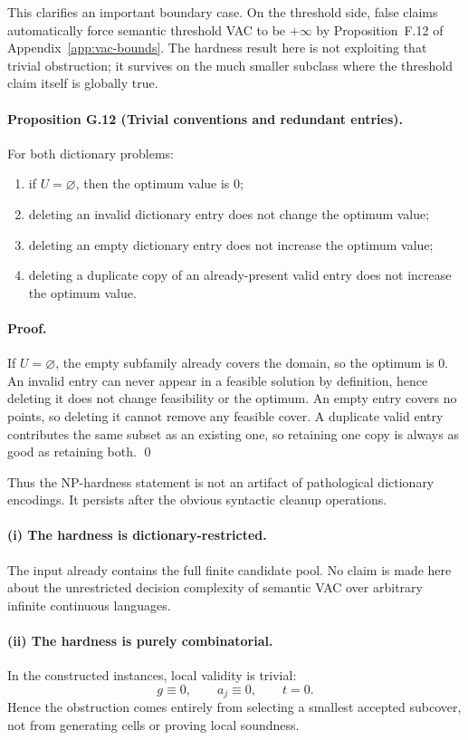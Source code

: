This clarifies an important boundary case. On the threshold side, false claims automatically force semantic threshold VAC to be $+\infty$ by Proposition~F.12 of Appendix~\ref{app:vac-bounds}. The hardness result here is not exploiting that trivial obstruction; it survives on the much smaller subclass where the threshold claim itself is globally true.

\paragraph{Proposition G.12 (Trivial conventions and redundant entries).}
For both dictionary problems:
\begin{enumerate}
    \item if $U=\varnothing$, then the optimum value is $0$;
    \item deleting an invalid dictionary entry does not change the optimum value;
    \item deleting an empty dictionary entry does not increase the optimum value;
    \item deleting a duplicate copy of an already-present valid entry does not increase the optimum value.
\end{enumerate}

\paragraph{Proof.}
If $U=\varnothing$, the empty subfamily already covers the domain, so the optimum is $0$. An invalid entry can never appear in a feasible solution by definition, hence deleting it does not change feasibility or the optimum. An empty entry covers no points, so deleting it cannot remove any feasible cover. A duplicate valid entry contributes the same subset as an existing one, so retaining one copy is always as good as retaining both. \qed

Thus the NP-hardness statement is not an artifact of pathological dictionary encodings. It persists after the obvious syntactic cleanup operations.

\paragraph{(i) The hardness is dictionary-restricted.}
The input already contains the full finite candidate pool. No claim is made here about the unrestricted decision complexity of semantic VAC over arbitrary infinite continuous languages.

\paragraph{(ii) The hardness is purely combinatorial.}
In the constructed instances, local validity is trivial:
\[
g\equiv 0,
\qquad
 a_j\equiv 0,
\qquad
 t=0.
\]
Hence the obstruction comes entirely from selecting a smallest accepted subcover, not from generating cells or proving local soundness.

